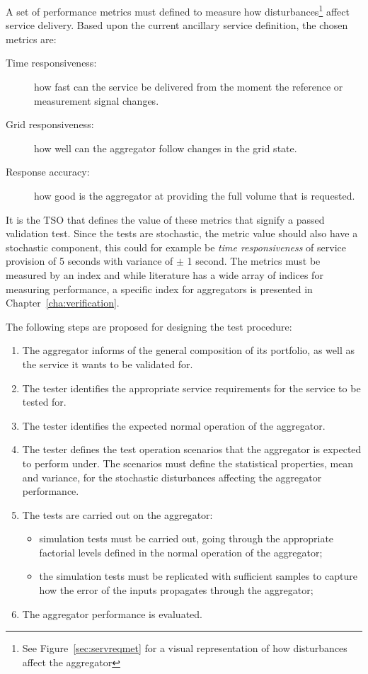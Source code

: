 A set of performance metrics must defined to measure how disturbances\footnote{See Figure~\ref{sec:servreqmet} for a visual representation of how disturbances affect the aggregator} affect service delivery. Based upon the current ancillary service definition, the chosen metrics are:
\begin{description}
	\item[Time responsiveness:] how fast can the service be delivered from the moment the reference or measurement signal changes.
	\item[Grid responsiveness:] how well can the aggregator follow changes in the grid state.
	\item[Response accuracy:] how good is the aggregator at providing the full volume that is requested.
\end{description}

It is the TSO that defines the value of these metrics that signify a passed validation test. Since the tests are stochastic, the metric value should also have a stochastic component, this could for example be \emph{time responsiveness} of service provision of 5 seconds with variance of $\pm$ 1 second. The metrics must be measured by an index and while literature has a wide array of indices for measuring performance, a specific index for aggregators is presented in Chapter~\ref{cha:verification}.

The following steps are proposed for designing the test procedure:
\begin{enumerate}
	\item The aggregator informs of the general composition of its portfolio, as well as the service it wants to be validated for.
	\item The tester identifies the appropriate service requirements for the service to be tested for.
	\item The tester identifies the expected normal operation of the aggregator.
	\item The tester defines the test operation scenarios that the aggregator is expected to perform under. The scenarios must define the statistical properties, \eg mean and variance, for the stochastic disturbances affecting the aggregator performance.
	\item The tests are carried out on the aggregator:
		\begin{itemize}
			\item simulation tests must be carried out, going through the appropriate factorial levels defined in the normal operation of the aggregator;
			\item the simulation tests must be replicated with sufficient samples to capture how the error of the inputs propagates through the aggregator;
		\end{itemize}
	\item The aggregator performance is evaluated.	
\end{enumerate}

